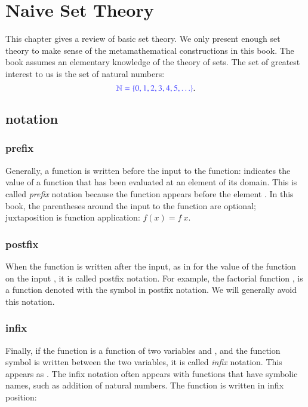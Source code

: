 \chapter{Naive Set Theory}

This chapter gives a review of basic set theory.  We only present enough set theory to make sense of the metamathematical constructions in this book.
The book assumes an elementary knowledge of the theory of sets.  The set of greatest interest to us is the set of natural numbers:
$$
\mc{\ring{N}=\{0,1,2,3,4,5,\ldots\}}.
$$


\section{notation}


\subsection{prefix}

Generally, a function is written before the input to the function:
 indicates the value of a function  that has been evaluated
at an element  of its domain.  This is called {\it prefix} notation
because the function  appears before the element .  
In this book, the parentheses around the input  to the function are optional;
juxtaposition is function application:
$f(x) = f~x$.

\subsection{postfix}

When the function is written after the input, as in  for the value of the function on the input , it is called postfix notation.  For example, the factorial function , is a function denoted with the symbol \mc{$!$} in postfix notation.   We will generally avoid this notation.

\subsection{infix}

Finally, if the function is a function of two variables  and , and the function symbol is written between the two variables, it is called {\it infix} notation.  This appears as .    The infix notation often appears with functions that have symbolic names, such as addition of natural numbers.  The function is written in infix position:

